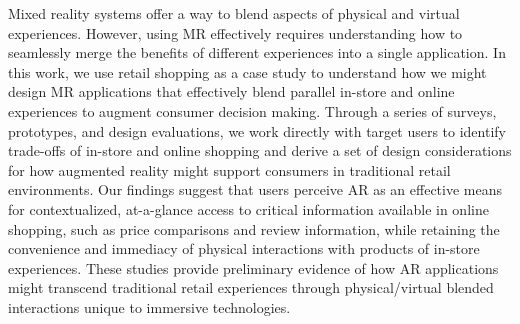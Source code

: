 Mixed reality systems offer a way to blend aspects of physical and virtual experiences. However, using MR effectively requires understanding how to seamlessly merge the benefits of different experiences into a single application.  In this work, we use retail shopping as a case study to understand how we might design MR applications that effectively blend parallel in-store and online experiences to augment consumer decision making. Through a series of surveys, prototypes, and design evaluations, we work directly with target users to identify trade-offs of in-store and online shopping and derive a set of design considerations for how augmented reality might support consumers in traditional retail environments. 
Our findings suggest that users perceive AR as an effective means for contextualized, at-a-glance access to critical information available in online shopping, such as price comparisons and review information, while retaining the convenience and immediacy of physical interactions with products of in-store experiences.  These studies provide preliminary evidence of how AR applications might transcend traditional retail experiences through physical/virtual blended interactions unique to immersive technologies.
